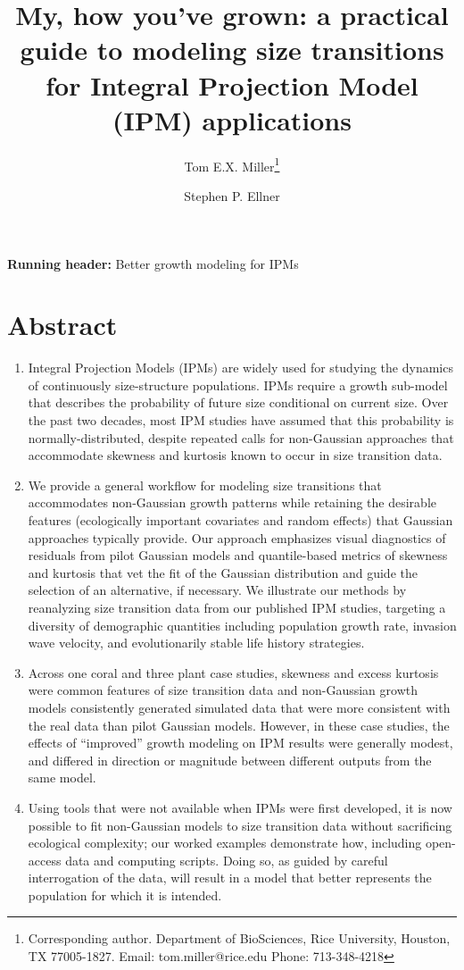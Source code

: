 \documentclass[12pt]{article}
\title{My, how you've grown: a practical guide to modeling size transitions for Integral Projection Model (IPM) applications}
\author[a]{Tom E.X. Miller\thanks{Corresponding author. Department of BioSciences, Rice University,
Houston, TX 77005-1827. Email: tom.miller@rice.edu Phone: 713-348-4218}}
\author[b]{Stephen P. Ellner}
\affil[a]{Department of BioSciences, Rice University, Houston, TX }
\affil[b]{Department of Ecology and Evolutionary Biology, Cornell University, Ithaca, New York}
\date{}
\begin{document}
\renewcommand{\baselinestretch}{1.25} 
\maketitle

\bigskip 
\noindent\textbf{Running header:} Better growth modeling for IPMs

\newpage
\linenumbers
\section*{Abstract} 
\begin{enumerate}
	\item Integral Projection Models (IPMs) are widely used for studying the dynamics of continuously size-structure populations. IPMs require a growth sub-model that describes the probability of future size conditional on current size. Over the past two decades, most IPM studies have assumed that this probability is normally-distributed, despite repeated calls for non-Gaussian approaches that accommodate skewness and kurtosis known to occur in size transition data. %
	\item We provide a general workflow for modeling size transitions that accommodates non-Gaussian growth patterns while retaining the desirable features (ecologically important covariates and random effects) that Gaussian approaches typically provide. Our approach emphasizes visual diagnostics of residuals from pilot Gaussian models and quantile-based metrics of skewness and kurtosis that vet the fit of the Gaussian distribution and guide the selection of an alternative, if necessary. We illustrate our methods by reanalyzing size transition data from our published IPM studies, targeting a diversity of demographic quantities including population growth rate, invasion wave velocity, and evolutionarily stable life history strategies. %
	\item Across one coral and three plant case studies, skewness and excess kurtosis were common features of size transition data and non-Gaussian growth models consistently generated simulated data that were more consistent with the real data than pilot Gaussian models. However, in these case studies, the effects of ``improved'' growth modeling on IPM results were generally modest, and differed in direction or magnitude between different outputs from the same model. 
	\item Using tools that were not available when IPMs were first developed, it is now possible to fit non-Gaussian models to size transition data without sacrificing ecological complexity; our worked examples demonstrate how, including open-access data and computing scripts. Doing so, as guided by careful interrogation of the data, will result in a model that better represents the population for which it is intended. %
\end{enumerate}
\end{document}
